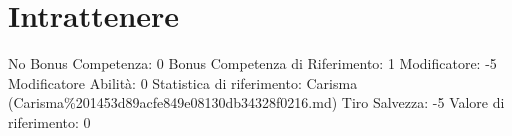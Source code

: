 \section{Intrattenere}\label{intrattenere}

\begin{description}
\tightlist
\item[Tags: ABI]
No Bonus Competenza: 0 Bonus Competenza di Riferimento: 1 Modificatore:
-5 Modificatore Abilità: 0 Statistica di riferimento: Carisma
(Carisma\%201453d89acfe849e08130db34328f0216.md) Tiro Salvezza: -5
Valore di riferimento: 0
\end{description}
